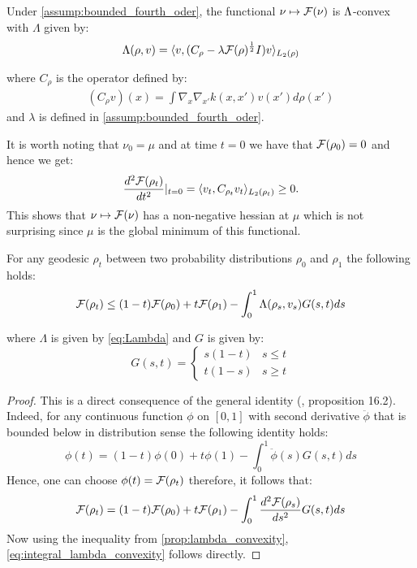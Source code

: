 \begin{proposition}
\label{prop:lambda_convexity} Under \cref{assump:bounded_fourth_oder}, the functional $\nu\mapsto {{\mathcal F}}(\nu)$ is $\text{\ensuremath{\Lambda}}$-convex
with $\Lambda$ given by:
\begin{equation}
\Lambda(\rho,v)=\langle v,(C_{\rho}-\lambda {{\mathcal F}}(\rho)^{\frac{1}{2}}I)v\rangle_{L_{2}(\rho)}\label{eq:Lambda}
\end{equation}

where $C_{\rho}$ is the operator defined by:
\begin{align}\label{eq:positive_operator_C}
	(C_{\rho}v)(x)=\int\nabla_{x}\nabla_{x'}k(x,x')v(x')d\rho(x')
\end{align}
and $\lambda$ is defined in \cref{assump:bounded_fourth_oder}.
\end{proposition}
%
%
It is worth noting that $\nu_{0}=\mu$ and at time $t=0$ we have
that ${{\mathcal F}}(\rho_{0})=0$ and hence we get:
\[
\frac{d^{2}{{\mathcal F}}(\rho_{t})}{dt^{2}}\vert_{t=0}=\langle v_{t},C_{\rho_{t}}v_{t}\rangle_{L_{2}(\rho_{t})}\geq0.
\]
This shows that $\nu\mapsto {{\mathcal F}}(\nu)$ has a non-negative
hessian at $\mu$ which is not surprising since $\mu$ is the global
minimum of this functional.
\begin{corollary}\label{cor:integral_lambda_convexity}
For any geodesic $\rho_{t}$ between two probability distributions
$\rho_{0}$ and $\rho_{1}$ the following holds:
\begin{equation}
{{\mathcal F}}(\rho_{t})\leq(1-t){{\mathcal F}}(\rho_{0})+t{{\mathcal F}}(\rho_{1})-\int_{0}^{1}\Lambda(\rho_{s},v_{s})G(s,t)ds\label{eq:integral_lambda_convexity}
\end{equation}

where $\Lambda$ is given by \cref{eq:Lambda} and $G$ is given
by:
\[
G(s,t)=\begin{cases}
s(1-t) & s\leq t\\
t(1-s) & s\geq t
\end{cases}
\]
\end{corollary}
%
\begin{proof}
This is a direct consequence of the general identity (\cite{Villani:2009},
proposition 16.2). Indeed, for any continuous function $\phi$ on
$[0,1]$ with second derivative $\ddot{\phi}$ that is bounded below
in distribution sense the following identity holds:
\[
\phi(t)=(1-t)\phi(0)+t\phi(1)-\int_{0}^{1}\ddot{\phi}(s)G(s,t)ds
\]
Hence, one can choose $\phi(t)={{\mathcal F}}(\rho_{t})$ therefore, 
it follows that:
\[
{{\mathcal F}}(\rho_{t})=(1-t){{\mathcal F}}(\rho_{0})+t{{\mathcal F}}(\rho_{1})-\int_{0}^{1}\frac{d^{2}{{\mathcal F}}(\rho_{s})}{ds^{2}}G(s,t)ds
\]
Now using the inequality from \cref{prop:lambda_convexity}, \cref{eq:integral_lambda_convexity}
follows directly. 
\end{proof}
